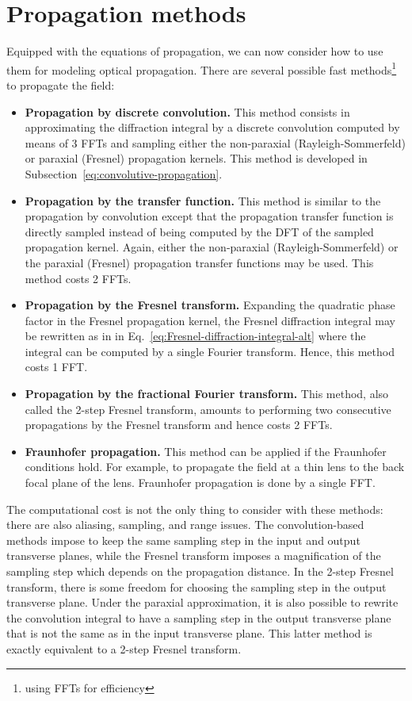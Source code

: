 \documentclass[a4paper]{article}
\begin{document}
\newpage
\section{Propagation methods}

Equipped with the equations of propagation, we can now consider how to use them
for modeling optical propagation. There are several possible fast
methods\footnote{using FFTs for efficiency} to propagate the field:
\begin{itemize}
\item \textbf{Propagation by discrete convolution.} This method consists in
      approximating the diffraction integral by a discrete convolution computed
      by means of 3 FFTs and sampling either the non-paraxial
      (Rayleigh-Sommerfeld) or paraxial (Fresnel) propagation kernels. This
      method is developed in Subsection~\ref{eq:convolutive-propagation}.
\item \textbf{Propagation by the transfer function.} This method is similar to
      the propagation by convolution except that the propagation transfer
      function is directly sampled instead of being computed by the DFT of the
      sampled propagation kernel. Again, either the non-paraxial
      (Rayleigh-Sommerfeld) or the paraxial (Fresnel) propagation transfer
      functions may be used. This method costs 2 FFTs.
\item \textbf{Propagation by the Fresnel transform.} Expanding the quadratic
      phase factor in the Fresnel propagation kernel, the Fresnel diffraction
      integral may be rewritten as in in
      Eq.~\eqref{eq:Fresnel-diffraction-integral-alt} where the integral can be
      computed by a single Fourier transform. Hence, this method costs 1 FFT.
\item \textbf{Propagation by the fractional Fourier transform.} This method,
      also called the 2-step Fresnel transform, amounts to performing two
      consecutive propagations by the Fresnel transform and hence costs 2 FFTs.
\item \textbf{Fraunhofer propagation.} This method can be applied if the
      Fraunhofer conditions hold. For example, to propagate the field at a thin
      lens to the back focal plane of the lens. Fraunhofer propagation is done
      by a single FFT.
\end{itemize}
The computational cost is not the only thing to consider with these methods:
there are also aliasing, sampling, and range issues. The convolution-based
methods impose to keep the same sampling step in the input and output
transverse planes, while the Fresnel transform imposes a magnification of the
sampling step which depends on the propagation distance. In the 2-step Fresnel
transform, there is some freedom for choosing the sampling step in the output
transverse plane. Under the paraxial approximation, it is also possible to
rewrite the convolution integral to have a sampling step in the output
transverse plane that is not the same as in the input transverse plane. This
latter method is exactly equivalent to a 2-step Fresnel transform.
\end{document}
